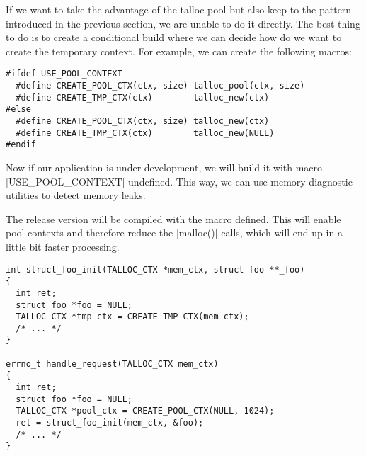 If we want to take the advantage of the talloc pool but also keep to the
pattern introduced in the previous section, we are unable to do it directly. The
best thing to do is to create a conditional build where we can decide how do we
want to create the temporary context. For example, we can create the following
macros:

\begin{lstlisting}[caption={Conditional temporary context
macros},label=lst:tmp-ctx-4]
#ifdef USE_POOL_CONTEXT
  #define CREATE_POOL_CTX(ctx, size) talloc_pool(ctx, size)
  #define CREATE_TMP_CTX(ctx)        talloc_new(ctx)
#else
  #define CREATE_POOL_CTX(ctx, size) talloc_new(ctx)
  #define CREATE_TMP_CTX(ctx)        talloc_new(NULL)
#endif
\end{lstlisting}

\noindent
Now if our application is under development, we will build it with macro
|USE_POOL_CONTEXT| undefined. This way, we  can use memory diagnostic
utilities to detect memory leaks.

The release version will be compiled with the macro defined. This will  enable
pool contexts and therefore reduce the |malloc()| calls, which will end up in a
little bit faster processing.

\begin{lstlisting}[caption={Conditional temporary context},label=lst:tmp-ctx-5]
int struct_foo_init(TALLOC_CTX *mem_ctx, struct foo **_foo)
{
  int ret;
  struct foo *foo = NULL;
  TALLOC_CTX *tmp_ctx = CREATE_TMP_CTX(mem_ctx);
  /* ... */
}

errno_t handle_request(TALLOC_CTX mem_ctx)
{
  int ret;
  struct foo *foo = NULL;
  TALLOC_CTX *pool_ctx = CREATE_POOL_CTX(NULL, 1024);
  ret = struct_foo_init(mem_ctx, &foo);
  /* ... */
}
\end{lstlisting}
